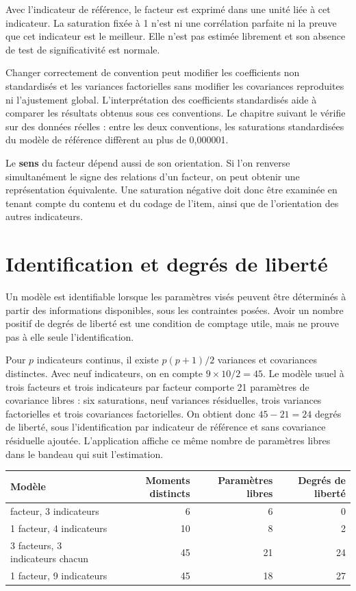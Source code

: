 \documentclass[
  french,
  11pt,
  a4paper,
  DIV=11,
  numbers=noendperiod]{scrreprt}
\newcounter{none} %
\begin{document}
Avec l'indicateur de référence, le facteur est exprimé dans une unité
liée à cet indicateur. La saturation fixée à 1 n'est ni une corrélation
parfaite ni la preuve que cet indicateur est le meilleur. Elle n'est pas
estimée librement et son absence de test de significativité est normale.

Changer correctement de convention peut modifier les coefficients non
standardisés et les variances factorielles sans modifier les covariances
reproduites ni l'ajustement global. L'interprétation des coefficients
standardisés aide à comparer les résultats obtenus sous ces conventions.
Le chapitre suivant le vérifie sur des données réelles : entre les deux
conventions, les saturations standardisées du modèle de référence
diffèrent au plus de 0,000001.

Le \textbf{sens} du facteur dépend aussi de son orientation. Si l'on
renverse simultanément le signe des relations d'un facteur, on peut
obtenir une représentation équivalente. Une saturation négative doit
donc être examinée en tenant compte du contenu et du codage de l'item,
ainsi que de l'orientation des autres indicateurs.

\section{Identification et degrés de
liberté}\label{identification-et-degruxe9s-de-libertuxe9}

Un modèle est identifiable lorsque les paramètres visés peuvent être
déterminés à partir des informations disponibles, sous les contraintes
posées. Avoir un nombre positif de degrés de liberté est une condition
de comptage utile, mais ne prouve pas à elle seule l'identification.

Pour \(p\) indicateurs continus, il existe \(p(p+1)/2\) variances et
covariances distinctes. Avec neuf indicateurs, on en compte
\(9\times10/2=45\). Le modèle usuel à trois facteurs et trois
indicateurs par facteur comporte 21 paramètres de covariance libres :
six saturations, neuf variances résiduelles, trois variances
factorielles et trois covariances factorielles. On obtient donc
\(45-21=24\) degrés de liberté, sous l'identification par indicateur de
référence et sans covariance résiduelle ajoutée. L'application affiche
ce même nombre de paramètres libres dans le bandeau qui suit
l'estimation.


{\def\LTcaptype{none} %
\begin{longtable}[]{@{}lrrr@{}}
\toprule\noalign{}
Modèle & Moments distincts & Paramètres libres & Degrés de liberté \\
\midrule\noalign{}
\endhead
\bottomrule\noalign{}
\endlastfoot
1 facteur, 3 indicateurs & 6 & 6 & 0 \\
1 facteur, 4 indicateurs & 10 & 8 & 2 \\
3 facteurs, 3 indicateurs chacun & 45 & 21 & 24 \\
1 facteur, 9 indicateurs & 45 & 18 & 27 \\
\end{longtable}
}
\end{document}
